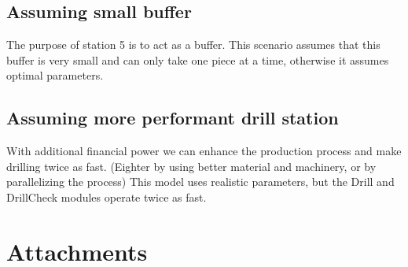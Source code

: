 \documentclass{report}
\begin{document}
\subsection{Assuming small buffer}
The purpose of station 5 is to act as a buffer. This scenario assumes that this buffer is very small and can only take one piece at a time, otherwise it assumes optimal parameters.
\subsection{Assuming more performant drill station}
With additional financial power we can enhance the production process and make drilling twice as fast. (Eighter by using better material and machinery, or by parallelizing the process) This model uses realistic parameters, but the Drill and DrillCheck modules operate twice as fast.
\section{Attachments}
\end{document}
